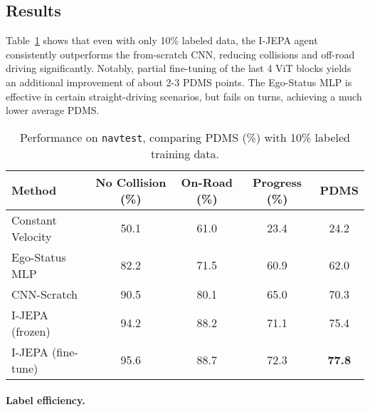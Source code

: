 \documentclass{article}
\begin{document}
\subsection{Results}
Table~\ref{tab:main} shows that even with only 10\% labeled data, the I-JEPA agent consistently outperforms the from-scratch CNN, reducing collisions and off-road driving significantly. Notably, partial fine-tuning of the last 4 ViT blocks yields an additional improvement of about 2-3 PDMS points. The Ego-Status MLP is effective in certain straight-driving scenarios, but fails on turns, achieving a much lower average PDMS.

\begin{table}[t]
\centering
\caption{Performance on \texttt{navtest}, comparing PDMS (\%) with 10\% labeled training data.}
\label{tab:main}
\begin{tabular}{lcccc}
\toprule
Method & No Collision (\%) & On-Road (\%) & Progress (\%) & PDMS \\
\midrule
Constant Velocity & 50.1 & 61.0 & 23.4 & 24.2 \\
Ego-Status MLP & 82.2 & 71.5 & 60.9 & 62.0 \\
CNN-Scratch & 90.5 & 80.1 & 65.0 & 70.3 \\
I-JEPA (frozen) & 94.2 & 88.2 & 71.1 & 75.4 \\
I-JEPA (fine-tune) & 95.6 & 88.7 & 72.3 & \textbf{77.8} \\
\bottomrule
\end{tabular}
\end{table}

\paragraph{Label efficiency.}

\end{document}

